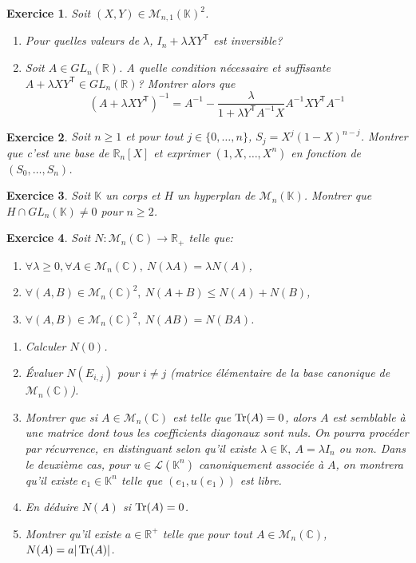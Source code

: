 \documentclass[12pt]{article}
\newtheorem{exercise}{Exercice}[section]
\theoremstyle{remark}
\theoremstyle{remark}
\newcommand{\K}{\mathbb{K}} \newcommand{\R}{\mathbb{R}}
\newcommand{\C}{\mathbb{C}} \newcommand{\Q}{\mathbb{Q}}
\newcommand{\M}{\mathcal{M}} \renewcommand{\L}{\mathcal{L}}
\begin{document}
\begin{exercise}
	Soit $(X,Y)\in\M_{n,1}(\K)^{2}$.
	\begin{enumerate}
		\item
		Pour quelles valeurs de $\lambda$, $I_{n}+\lambda XY^\mathsf{T}$ est
		inversible?
		\item
		Soit $A\in GL_{n}(\R)$. A quelle condition nécessaire et suffisante
		$A+\lambda XY^\mathsf{T}\in GL_{n}(\R)$? Montrer alors que 
		$$(A+\lambda XY^\mathsf{T})^{-1}=A^{-1}-\frac{\lambda}{1+\lambda
		Y^{\mathsf{T}}A^{-1}X}A^{-1}XY^{\mathsf{T}}A^{-1}$$
	\end{enumerate}
\end{exercise}

\begin{exercise}
	Soit $n\geqslant1$ et pour tout $j\in\{0,\dots,n\}$, $S_{j}=X^{j}(1-X)^{n-j}$.
	Montrer que c'est une base de $\R_{n}[X]$ et exprimer $(1,X,\dots,X^{n})$ en
	fonction de $(S_{0},\dots,S_{n})$.
\end{exercise}

\begin{exercise}
	Soit $\K$ un corps et $H$ un hyperplan de $\M_{n}(\K)$. Montrer que $H\cap
	GL_{n}(\K)\neq 0$ pour $n\geqslant2$.
\end{exercise}

\begin{exercise}
	Soit $N:\M_{n}(\C)\to\R_{+}$ telle que:
	\begin{enumerate}
		\item
		[(i)] $\forall \lambda\geqslant0,\forall A\in\M_{n}(\C),~N(\lambda
		A)=\lambda N(A)$,
		\item
		[(ii)] $\forall (A,B)\in\M_{n}(\C)^{2},~N(A+B)\leqslant N(A)+N(B)$,
		\item
		[(iii)] $\forall (A,B)\in\M_{n}(\C)^{2},~N(AB)=N(BA)$.
	\end{enumerate}
	\begin{enumerate}
		\item
		Calculer $N(0)$.
		\item
		Évaluer $N(E_{i,j})$ pour $i\neq j$ (matrice élémentaire de la base
		canonique de $\M_{n}(\C)$).
		\item
		Montrer que si $A\in\M_{n}(\C)$ est telle que $\operatorname{Tr}(A)=0$, alors $A$ est
		semblable à une matrice dont tous les coefficients diagonaux sont nuls. On
		pourra procéder par récurrence, en distinguant selon qu'il existe
		$\lambda\in\K,~A=\lambda I_{n}$ ou non. Dans le deuxième cas, pour
		$u\in\L(\K^{n})$ canoniquement associée à $A$, on montrera qu'il existe
		$e_{1}\in\K^{n}$ telle que $(e_{1},u(e_{1}))$ est libre.
		\item
		En déduire $N(A)$ si $\operatorname{Tr}(A)=0$.
		\item
		Montrer qu'il existe $a\in\R^{+}$ telle que pour tout $A\in\M_{n}(\C)$,
		$N(A)=a\vert\operatorname{Tr}(A)\vert$.
	\end{enumerate}
\end{exercise}
\end{document}
